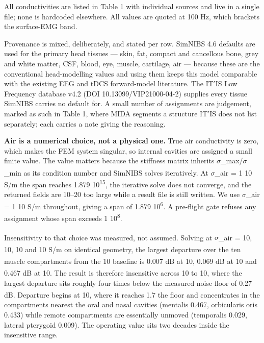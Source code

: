 \documentclass[
  11pt,
  letterpaper,
]{article}
\newcounter{none} %
\begin{document}
All conductivities are listed in Table 1 with individual sources and live in a
single file; none is hardcoded elsewhere. All values are quoted at 100 Hz, which
brackets the surface-EMG band.

Provenance is mixed, deliberately, and stated per row. SimNIBS 4.6 defaults are
used for the primary head tissues --- skin, fat, compact and cancellous bone, grey
and white matter, CSF, blood, eye, muscle, cartilage, air --- because these are
the conventional head-modelling values and using them keeps this model
comparable with the existing EEG and tDCS forward-model literature. The IT'IS
Low Frequency database v4.2 (DOI 10.13099/VIP21000-04-2) supplies every tissue
SimNIBS carries no default for. A small number of assignments are judgement,
marked as such in Table 1, where MIDA segments a structure IT'IS does not list
separately; each carries a note giving the reasoning.

\textbf{Air is a numerical choice, not a physical one.} True air conductivity is
zero, which makes the FEM system singular, so internal cavities are assigned a
small finite value. The value matters because the stiffness matrix inherits
$\sigma$\_max/$\sigma$\_min as its condition number and SimNIBS solves iteratively. At
$\sigma$\_air = 1 \texttimes{} 10\textsuperscript{} S/m the span reaches 1.879 \texttimes{} 10\textsuperscript{15}, the iterative solve does
not converge, and the returned fields are 10--20\texttimes{} too large while a result file
is still written. We use $\sigma$\_air = 1 \texttimes{} 10\textsuperscript{} S/m throughout, giving a span of
1.879 \texttimes{} 10\textsuperscript{6}. A pre-flight gate refuses any assignment whose span exceeds
1 \texttimes{} 10\textsuperscript{8}.

Insensitivity to that choice was measured, not assumed. Solving at
$\sigma$\_air = 10\textsuperscript{}, 10\textsuperscript{}, 10\textsuperscript{} and 10\textsuperscript{} S/m on identical geometry, the largest
departure over the ten muscle compartments from the 10\textsuperscript{} baseline is 0.007 dB at
10\textsuperscript{}, 0.069 dB at 10\textsuperscript{} and 0.467 dB at 10\textsuperscript{}. The result is therefore
insensitive across 10\textsuperscript{} to 10\textsuperscript{}, where the largest departure sits roughly four
times below the measured noise floor of 0.27 dB. Departure begins at 10\textsuperscript{}, where
it reaches 1.7\texttimes{} the floor and concentrates in the compartments nearest the oral
and nasal cavities (mentalis \textminus{}0.467, orbicularis oris \textminus{}0.433) while remote
compartments are essentially unmoved (temporalis \textminus{}0.029, lateral pterygoid
\textminus{}0.009). The operating value sits two decades inside the insensitive range.
\end{document}
